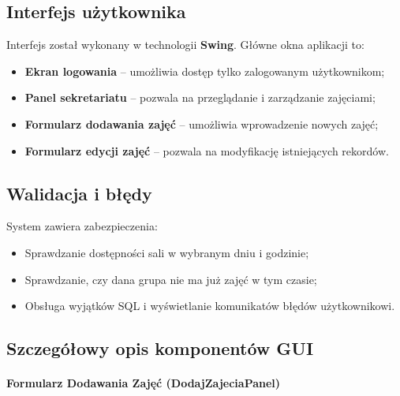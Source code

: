 \subsection{Interfejs użytkownika}

Interfejs został wykonany w technologii \textbf{Swing}. Główne okna aplikacji to:

\begin{itemize}
    \item \textbf{Ekran logowania} – umożliwia dostęp tylko zalogowanym użytkownikom;
    \item \textbf{Panel sekretariatu} – pozwala na przeglądanie i zarządzanie zajęciami;
    \item \textbf{Formularz dodawania zajęć} – umożliwia wprowadzenie nowych zajęć;
    \item \textbf{Formularz edycji zajęć} – pozwala na modyfikację istniejących rekordów.
\end{itemize}

\subsection{Walidacja i błędy}

System zawiera zabezpieczenia:

\begin{itemize}
    \item Sprawdzanie dostępności sali w wybranym dniu i godzinie;
    \item Sprawdzanie, czy dana grupa nie ma już zajęć w tym czasie;
    \item Obsługa wyjątków SQL i wyświetlanie komunikatów błędów użytkownikowi.
\end{itemize}

\subsection{Szczegółowy opis komponentów GUI}

\paragraph{Formularz Dodawania Zajęć (DodajZajeciaPanel)}


